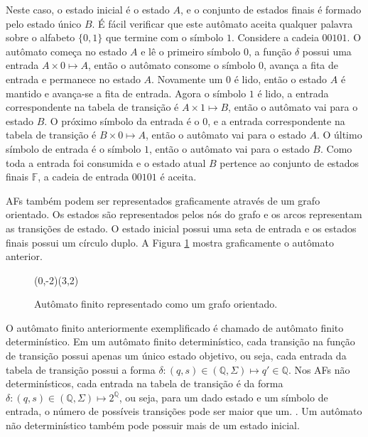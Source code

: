 \documentclass[12pt,a4paper]{article}
\begin{document}
Neste caso, o estado inicial é o estado $A$, e o conjunto de estados finais
é formado pelo estado único $B$. É fácil verificar que este autômato aceita
qualquer palavra sobre o alfabeto $\{0,1\}$ que termine com o símbolo $1$.
Considere a cadeia $00101$. O autômato começa no estado $A$ e lê o primeiro
símbolo $0$, a função $\delta$ possui uma entrada $A \times 0 \mapsto A$,
então o autômato consome o símbolo $0$, avança a fita de entrada e permanece
no estado $A$. Novamente um $0$ é lido, então o estado $A$ é mantido e
avança-se a fita de entrada. Agora o símbolo $1$ é lido, a entrada correspondente
na tabela de transição é $A \times 1 \mapsto B$, então o autômato vai para
o estado $B$. O próximo símbolo da entrada é o $0$, e a entrada correspondente
na tabela de transição é $B \times 0 \mapsto A$, então o autômato vai para o
estado $A$. O último símbolo de entrada é o símbolo $1$, então o autômato vai
para o estado $B$. Como toda a entrada foi consumida e o estado atual $B$
pertence ao conjunto de estados finais $\mathbb{F}$, a cadeia de entrada $00101$ é
aceita.

AFs também podem ser representados graficamente através de
um grafo orientado. Os estados são representados pelos nós do grafo
e os arcos representam as transições de estado. O estado inicial possui
uma seta de entrada e os estados finais possui um círculo duplo. A
Figura \ref{fig:automata} mostra graficamente o autômato anterior.

\begin{figure}[htp]
\begin{center}
\begin{VCPicture}{(0,-2)(3,2)}
 
 
 
\end{VCPicture}
\caption{Autômato finito representado como um grafo orientado.}
\label{fig:automata}
\end{center}
\end{figure}

O autômato finito anteriormente exemplificado é chamado de autômato finito determinístico.
Em um autômato finito determinístico, cada transição na função de transição possui apenas
um único estado objetivo, ou seja, cada entrada da tabela de transição possui a forma
$\delta: (q, s) \in (\mathbb{Q},\Sigma) \mapsto q' \in \mathbb{Q}$. Nos AFs não
determinísticos, cada entrada na tabela de transição é da forma
$\delta: (q, s) \in (\mathbb{Q},\Sigma) \mapsto 2^{\mathbb{Q}}$,
ou seja, para um dado estado e um símbolo de entrada, o número de possíveis
transições pode ser maior que um. .  Um autômato não
determinístico também pode possuir mais de um estado inicial.
\end{document}
